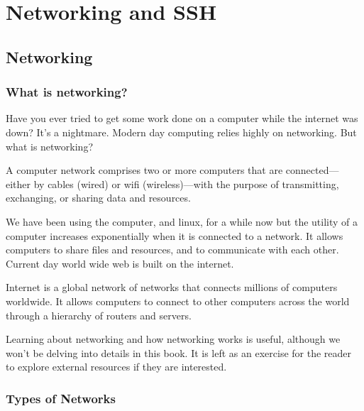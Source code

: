 \chapter{Networking and SSH}


\section{Networking}

\subsection{What is networking?}

Have you ever tried to get some work done on a computer
while the internet was down? It's a nightmare.
Modern day computing relies highly on networking.
But what is networking?

\begin{definition}[Networking]
A computer network comprises two or more computers
that are connected—either by cables (wired) or wifi
(wireless)—with the purpose of transmitting, exchanging,
or sharing data and resources.
\end{definition}

We have been using the computer, and linux, for a while now
but the utility of a computer increases exponentially when
it is connected to a network. It allows computers to share
files and resources, and to communicate with each other.
Current day world wide web is built on the internet.

\begin{definition}[Internet]
Internet is a global network of networks that connects
millions of computers worldwide. It allows computers to
connect to other computers across the world through a
hierarchy of routers and servers.
\end{definition}

Learning about networking and how networking works
is useful, although we won't be delving into details
in this book. It is left as an exercise for the reader
to explore external resources if they are interested.


\subsection{Types of Networks}

